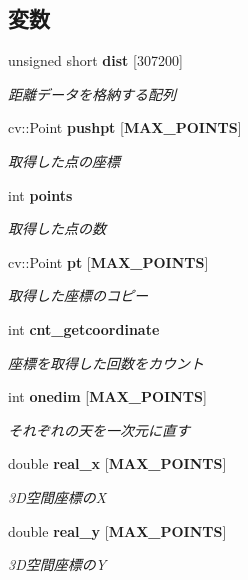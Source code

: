 \subsection*{変数}
\begin{DoxyCompactItemize}
\item 
unsigned short {\bf dist} [307200]
\begin{DoxyCompactList}\small\item\em 距離データを格納する配列 \end{DoxyCompactList}\item 
cv\-::\-Point {\bf pushpt} [{\bf M\-A\-X\-\_\-\-P\-O\-I\-N\-T\-S}]
\begin{DoxyCompactList}\small\item\em 取得した点の座標 \end{DoxyCompactList}\item 
int {\bf points}
\begin{DoxyCompactList}\small\item\em 取得した点の数 \end{DoxyCompactList}\item 
cv\-::\-Point {\bf pt} [{\bf M\-A\-X\-\_\-\-P\-O\-I\-N\-T\-S}]
\begin{DoxyCompactList}\small\item\em 取得した座標のコピー \end{DoxyCompactList}\item 
int {\bf cnt\-\_\-getcoordinate}
\begin{DoxyCompactList}\small\item\em 座標を取得した回数をカウント \end{DoxyCompactList}\item 
int {\bf onedim} [{\bf M\-A\-X\-\_\-\-P\-O\-I\-N\-T\-S}]
\begin{DoxyCompactList}\small\item\em それぞれの天を一次元に直す \end{DoxyCompactList}\item 
double {\bf real\-\_\-x} [{\bf M\-A\-X\-\_\-\-P\-O\-I\-N\-T\-S}]
\begin{DoxyCompactList}\small\item\em 3\-D空間座標の\-X \end{DoxyCompactList}\item 
double {\bf real\-\_\-y} [{\bf M\-A\-X\-\_\-\-P\-O\-I\-N\-T\-S}]
\begin{DoxyCompactList}\small\item\em 3\-D空間座標の\-Y \end{DoxyCompactList}\item 

\end{DoxyCompactItemize}
